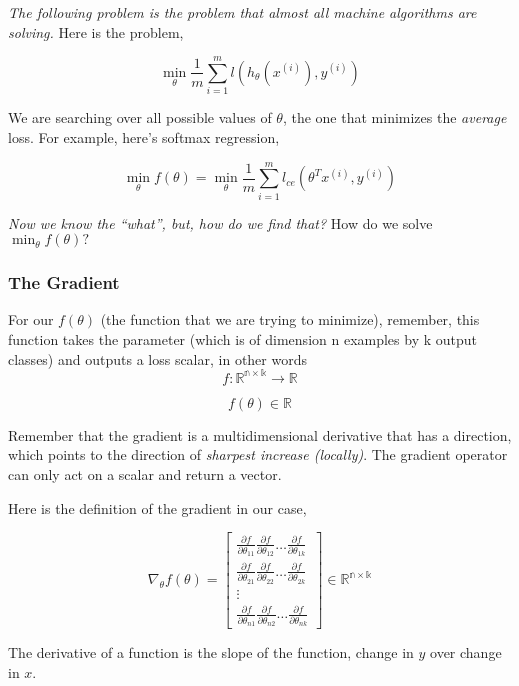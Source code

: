 \documentclass[
  letterpaper,
  DIV=11,
  numbers=noendperiod]{scrreprt}
\begin{document}
\emph{The following problem is the problem that almost all machine
algorithms are solving.} Here is the problem,

\[
\min_{\theta} \frac{1}{m} \sum_{i=1}^{m} l(h_\theta(x^{(i)}), y^{(i)})
\]

We are searching over all possible values of \(\theta\), the one that
minimizes the \emph{average} loss. For example, here's softmax
regression,

\[
\min_{\theta} f(\theta) = \min_{\theta} \frac{1}{m} \sum_{i=1}^{m} l_{ce}(\theta^T x^{(i)}, y^{(i)})
\]

\emph{Now we know the ``what'', but, how do we find that?} How do we
solve \(\min_{\theta} f(\theta) ?\)

\subsubsection*{The Gradient}\label{the-gradient}

For our \(f(\theta)\) (the function that we are trying to minimize),
remember, this function takes the parameter (which is of dimension n
examples by k output classes) and outputs a loss scalar, in other words
\[f: \mathbb{R^{n \times k}} \rightarrow \mathbb{R}\]

\[f(\theta) \in \mathbb{R}\]

Remember that the gradient is a multidimensional derivative that has a
direction, which points to the direction of \emph{sharpest increase
(locally)}. The gradient operator can only act on a scalar and return a
vector.

Here is the definition of the gradient in our case,

\[\nabla_\theta f(\theta) = \begin{bmatrix} 
\frac{\partial f}{\partial \theta_{11}} \frac{\partial f}{\partial \theta_{12}} \dots \frac{\partial f}{\partial \theta_{1k}} \\ 
\frac{\partial f}{\partial \theta_{21}} \frac{\partial f}{\partial \theta_{22}}  \dots \frac{\partial f}{\partial \theta_{2k}} \\ 
\vdots \\
\frac{\partial f}{\partial \theta_{n1}} \frac{\partial f}{\partial \theta_{n2}}  \dots \frac{\partial f}{\partial \theta_{nk}} 
\end{bmatrix} \in \mathbb{R^{n \times k}}\]

The derivative of a function is the slope of the function, change in
\(y\) over change in \(x\).
\end{document}
